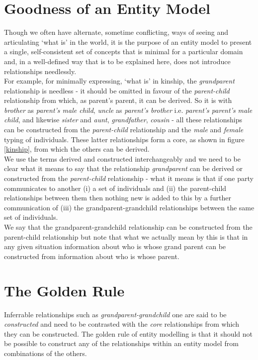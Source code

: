 \section{Goodness of an Entity Model}

\noindent Though we often have alternate, sometime conflicting, ways of seeing and articulating
`what is' in the world, it is the purpose of an entity model to present a single, self-consistent set of concepts that is minimal for a particular domain and, in a well-defined way that is to be explained here, does not introduce relationships needlessly.\\

\noindent For example, for minimally expressing, 
`what is' in kinship, the \textit{grandparent} relationship is needless - it should be omitted in favour of the \textit{parent-child} relationship from which, as parent's parent, it can be derived. So it is with \textit{brother} as \textit{parent's male child}, \textit{uncle} as \textit{parent's brother} i.e. \textit{parent's parent's male child}, and likewise \textit{sister} and \textit{aunt}, \textit{grandfather}, \textit{cousin} - all these relationships can be constructed from the \textit{parent-child} relationship and the \textit{male} and \textit{female} typing of individuals. These latter relationships form a core, as shown in figure \ref{kinship}, from which the others can be derived. \\

\noindent We use the terms derived and constructed interchangeably and we need to be clear what it means to say that the relationship \textit{grandparent} can be derived or constructed from the \textit{parent-child} relationship - what it means is that if one party communicates to another (i) a set of individuals and (ii) the parent-child relationships between them then nothing new is added to this by a further communication of (iii) the grandparent-grandchild relationships between the same set of individuals.  \\

\noindent We say that the grandparent-grandchild relationship can be constructed from the parent-child relationship but note that what we actually mean by this is that in any given situation information about who is whose grand parent can be constructed from information about who is whose parent. \\

\section{The Golden Rule}
\noindent Inferrable relationships such as \textit{grandparent-grandchild} one are said to be \textit{constructed} and need to be contrasted with the \textit{core} relationships from which they can be constructed. The golden rule of entity modelling is that it should not be possible to construct any of the relationships within an entity model from combinations of the others.\\

